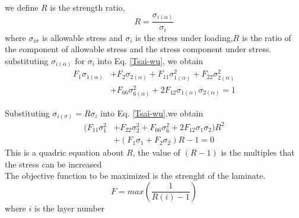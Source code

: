 \documentclass[smallextended]{svjour3}       %
\begin{document}
we define $R$ is the strength ratio,
\begin{equation}\label{strength-ratio}
    R=\frac{\sigma_{i(\alpha)}}{\sigma_i}
\end{equation}
where $\sigma_{i{\sigma}}$ is allowable stress and $\sigma_i$ is the stress under loading,$R$ is
the ratio of the component of allowable stress and the stress component under stress.
substituting $\sigma_{i(\alpha)}$ for $\sigma_i$ into Eq. \ref{Tsai-wu}, we obtain
\begin{equation}
	\begin{split}
		F_1\sigma_{1(\alpha)}&+F_2\sigma_{2(\alpha)}+F_{11}\sigma_{1(\alpha)}^2+F_{22}\sigma_{2(\alpha)}^2 \\
						&+F_{66}\sigma_{6(\alpha)}^2+2F_{12}\sigma_{1(\alpha)}\sigma_{2(\alpha)}=1
    \end{split}
\end{equation}

Substituting $\sigma_{i(\sigma)}=R\sigma_i$  into Eq. \ref{Tsai-wu},we obtain
\begin{equation}
	\begin{split}
		(F_{11}\sigma_1^2&+F_{22}\sigma_2^2+F_{66}\sigma_6^2+2F_{12}\sigma_1\sigma_2)R^2 \\
						 &+(F_1\sigma_1+F_2\sigma_2)R-1=0
	\end{split}
\end{equation}
This is a quadric equation about $R$, the value of $(R-1)$ is the multiples that the stress can be increased              \\
The objective function to be maximized is the strenght of the laminate.
\begin{equation}
	F=max(\frac{1}{R(i)-1})
\end{equation}
where $i$ is the layer number
\end{document}
